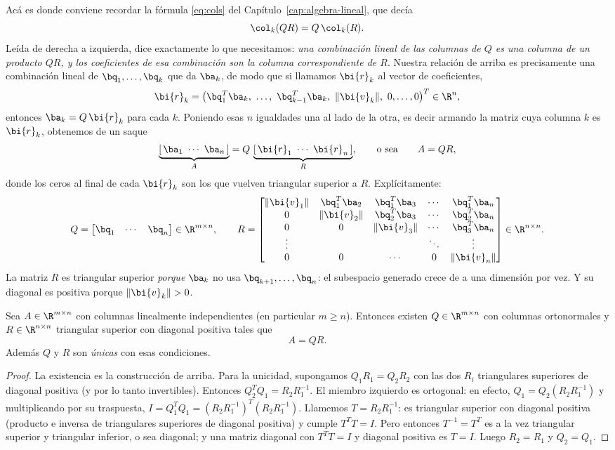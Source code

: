 Acá es donde conviene recordar la fórmula \eqref{eq:cols} del
Capítulo~\ref{cap:algebra-lineal}, que decía
\[
\col_k(QR)=Q\,\col_k(R) .
\]
Leída de derecha a izquierda, dice exactamente lo que necesitamos: \emph{una
combinación lineal de las columnas de $Q$ es una columna de un producto
$QR$, y los coeficientes de esa combinación son la columna correspondiente de
$R$}. Nuestra relación de arriba es precisamente una combinación lineal de
$\bq_1,\dots,\bq_k$ que da $\ba_k$, de modo que si llamamos $\bi{r}_k$ al
vector de coeficientes,
\[
\bi{r}_k=
\big(\bq_1^T\ba_k,\ \dots,\ \bq_{k-1}^T\ba_k,\ \|\bi{v}_k\|,\ 0,\dots,0\big)^T
\in\R^n ,
\]
entonces $\ba_k=Q\,\bi{r}_k$ para cada $k$. Poniendo esas $n$ igualdades una
al lado de la otra, es decir armando la matriz cuya columna $k$ es
$\bi{r}_k$, obtenemos de un saque
\[
\underbrace{[\,\ba_1\ \cdots\ \ba_n\,]}_{A}
=Q\,\underbrace{[\,\bi{r}_1\ \cdots\ \bi{r}_n\,]}_{R} ,
\qquad\text{o sea}\qquad
A=QR,
\]
donde los ceros al final de cada $\bi{r}_k$ son los que vuelven triangular
superior a $R$. Explícitamente:
\[
Q=\begin{bmatrix}\bq_1&\cdots&\bq_n\end{bmatrix}\in\R^{m\times n},
\qquad
R=\begin{bmatrix}
\|\bi{v}_1\| & \bq_1^T\ba_2 & \bq_1^T\ba_3 & \cdots & \bq_1^T\ba_n\\
0 & \|\bi{v}_2\| & \bq_2^T\ba_3 & \cdots & \bq_2^T\ba_n\\
0 & 0 & \|\bi{v}_3\| & \cdots & \bq_3^T\ba_n\\
\vdots & & & \ddots & \vdots\\
0 & 0 & \cdots & 0 & \|\bi{v}_n\|
\end{bmatrix}\in\R^{n\times n}.
\]
La matriz $R$ es triangular superior \emph{porque} $\ba_k$ no usa
$\bq_{k+1},\dots,\bq_n$: el subespacio generado crece de a una dimensión por
vez. Y su diagonal es positiva porque $\|\bi{v}_k\|>0$.

\begin{teorema}\label{teo:QR}
Sea $A\in\R^{m\times n}$ con columnas linealmente independientes (en
particular $m\ge n$). Entonces existen $Q\in\R^{m\times n}$ con columnas
ortonormales y $R\in\R^{n\times n}$ triangular superior con diagonal
positiva tales que
\[
A=QR .
\]
Además $Q$ y $R$ son \emph{únicas} con esas condiciones.
\end{teorema}

\begin{proof}
La existencia es la construcción de arriba. Para la unicidad, supongamos
$Q_1R_1=Q_2R_2$ con las dos $R_i$ triangulares superiores de diagonal
positiva (y por lo tanto invertibles). Entonces
$Q_2^TQ_1=R_2R_1^{-1}$. El miembro izquierdo es ortogonal: en efecto,
$Q_1=Q_2(R_2R_1^{-1})$ y multiplicando por su traspuesta,
$I=Q_1^TQ_1=(R_2R_1^{-1})^T(R_2R_1^{-1})$. Llamemos $T=R_2R_1^{-1}$: es
triangular superior con diagonal positiva (producto e inversa de
triangulares superiores de diagonal positiva) y cumple $T^TT=I$. Pero
entonces $T^{-1}=T^T$ es a la vez triangular superior y triangular inferior,
o sea diagonal; y una matriz diagonal con $T^TT=I$ y diagonal positiva es
$T=I$. Luego $R_2=R_1$ y $Q_2=Q_1$.
\end{proof}

